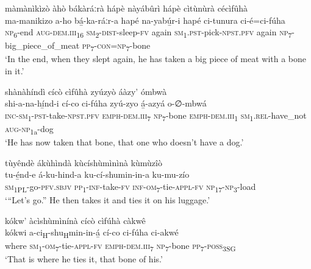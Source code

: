 màmànìkìzò àhò bákàráːrà hápè nàyábûrì hápè cìtùnùrà cécìfûhà\\
\gll ma-manikizo    a-ho      bá̲-ka-ráːr-a    hapé na-yabú̲r-i      hapé  ci-tunura      ci-é=ci-fúha\\
\textsc{np}\textsubscript{6}{}-end    \textsc{aug}{}-\textsc{dem}.\textsc{iii}\textsubscript{16}    \textsc{sm}\textsubscript{2}{}-\textsc{dist}{}-sleep-\textsc{fv}  again
\textsc{sm}\textsubscript{1}.\textsc{pst}{}-pick-\textsc{npst}.\textsc{pfv}  again  \textsc{np}\textsubscript{7}{}-big\_piece\_of\_meat  \textsc{pp}\textsubscript{7}{}-\textsc{con}=\textsc{np}\textsubscript{7}{}-bone\\
\glt ‘In the end, when they slept again, he has taken a big piece of meat with a bone in it.’\bigskip

shànàhíndì cícò cìfûhà zyúzyò áàzy’ ómbwà\\
\gll shi-a-na-hí̲nd-i      cí-co      ci-fúha zyú-zyo    á̲-azyá      o-∅-mbwá \\
\textsc{inc}{}-\textsc{sm}\textsubscript{1}{}-\textsc{pst}{}-take-\textsc{npst}.\textsc{pfv}  \textsc{emph}{}-\textsc{dem}.\textsc{iii}\textsubscript{7}  \textsc{np}\textsubscript{7}{}-bone
\textsc{emph}{}-\textsc{dem}.\textsc{iii}\textsubscript{1}  \textsc{sm}\textsubscript{1}.\textsc{rel}{}-have\_not  \textsc{aug}{}-\textsc{np}\textsubscript{1a}{}-dog\\
\glt ‘He has now taken that bone, that one who doesn’t have a dog.’\bigskip

tùyêndè ákùhìndà kùcíshùmìnìnà kùmùzîò \\
\gll tu-é̲nd-e    á-ku-hind-a    ku-cí-shumin-in-a    ku-mu-zío\\
\textsc{sm}\textsubscript{1PL}{}-go-\textsc{pfv}.\textsc{sbjv}  \textsc{pp}\textsubscript{1}{}-\textsc{inf}{}-take-\textsc{fv}  \textsc{inf}{}-\textsc{om}\textsubscript{7}{}-tie-\textsc{appl}{}-\textsc{fv}  \textsc{np}\textsubscript{17}{}-\textsc{np}\textsubscript{3}{}-load\\
\glt ‘“Let’s go.” He then takes it and ties it on his luggage.’\bigskip

kókw’ àcìshùmìnínà cícò cìfúhà càkwê\\
\gll kókwi    a-ci\textsubscript{H}{}-shu\textsubscript{H}min-in-á̲    cí-co      ci-fúha  ci-akwé\\
where    \textsc{sm}\textsubscript{1}{}-\textsc{om}\textsubscript{7}{}-tie-\textsc{appl}{}-\textsc{fv}  \textsc{emph}{}-\textsc{dem}.\textsc{iii}\textsubscript{7}  \textsc{np}\textsubscript{7}{}-bone  \textsc{pp}\textsubscript{7}{}-\textsc{poss}\textsubscript{3SG}\\
\glt ‘That is where he ties it, that bone of his.’\bigskip

